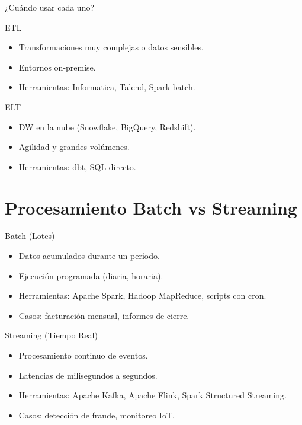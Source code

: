 \documentclass[aspectratio=169, 10pt, xcolor=table]{beamer}
\begin{document}
\begin{frame}{¿Cuándo usar cada uno?}
    \begin{block}{ETL}
        \begin{itemize}
            \item Transformaciones muy complejas o datos sensibles.
            \item Entornos on-premise.
            \item Herramientas: Informatica, Talend, Spark batch.
        \end{itemize}
    \end{block}
    \begin{block}{ELT}
        \begin{itemize}
            \item DW en la nube (Snowflake, BigQuery, Redshift).
            \item Agilidad y grandes volúmenes.
            \item Herramientas: dbt, SQL directo.
        \end{itemize}
    \end{block}
\end{frame}

\section{Procesamiento Batch vs Streaming}

\begin{frame}{Batch (Lotes)}
    \begin{itemize}
        \item Datos acumulados durante un período.
        \item Ejecución programada (diaria, horaria).
        \item Herramientas: Apache Spark, Hadoop MapReduce, scripts con cron.
        \item Casos: facturación mensual, informes de cierre.
    \end{itemize}
\end{frame}

\begin{frame}{Streaming (Tiempo Real)}
    \begin{itemize}
        \item Procesamiento continuo de eventos.
        \item Latencias de milisegundos a segundos.
        \item Herramientas: Apache Kafka, Apache Flink, Spark Structured Streaming.
        \item Casos: detección de fraude, monitoreo IoT.
    \end{itemize}
\end{frame}
\end{document}
